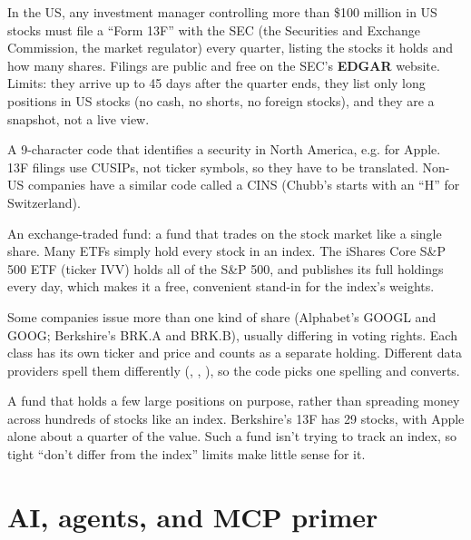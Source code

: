 \documentclass[11pt]{article}
\newcommand{\code}[1]{\texttt{\detokenize{#1}}}
\begin{document}
\begin{description}[style=nextline]
  \item[13F filing] In the US, any investment manager controlling more than \$100 million in US
        stocks must file a ``Form 13F'' with the SEC (the Securities and Exchange Commission,
        the market regulator) every quarter, listing the stocks it holds and how many shares.
        Filings are public and free on the SEC's \textbf{EDGAR} website. Limits: they arrive up
        to 45 days after the quarter ends, they list only long positions in US stocks (no cash,
        no shorts, no foreign stocks), and they are a snapshot, not a live view.
  \item[CUSIP] A 9-character code that identifies a security in North America, e.g.
        \code{037833100} for Apple. 13F filings use CUSIPs, not ticker symbols, so they have to
        be translated. Non-US companies have a similar code called a CINS (Chubb's starts with
        an ``H'' for Switzerland).
  \item[ETF] An exchange-traded fund: a fund that trades on the stock market like a single
        share. Many ETFs simply hold every stock in an index. The iShares Core S\&P 500 ETF
        (ticker IVV) holds all of the S\&P 500, and publishes its full holdings every day, which
        makes it a free, convenient stand-in for the index's weights.
  \item[Share classes] Some companies issue more than one kind of share (Alphabet's GOOGL and
        GOOG; Berkshire's BRK.A and BRK.B), usually differing in voting rights. Each class has
        its own ticker and price and counts as a separate holding. Different data providers
        spell them differently (\code{BRK.B}, \code{BRK-B}, \code{BRK B}), so the code picks one
        spelling and converts.
  \item[Concentrated fund] A fund that holds a few large positions on purpose, rather than
        spreading money across hundreds of stocks like an index. Berkshire's 13F has 29 stocks,
        with Apple alone about a quarter of the value. Such a fund isn't trying to track an
        index, so tight ``don't differ from the index'' limits make little sense for it.
\end{description}

\section{AI, agents, and MCP primer}
\end{document}
